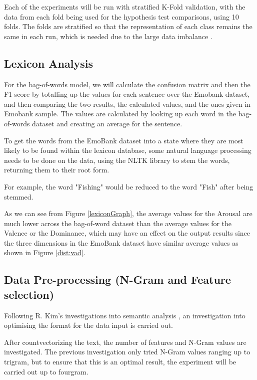 Each of the experiments will be run with stratified K-Fold validation, with the data from each fold being used for the hypothesis test comparisons, using 10 folds. The folds are stratified so that the representation of each class remains the same in each run, which is needed due to the large data imbalance \cite{kohavi1995study}.

\subsection{Lexicon Analysis}

For the bag-of-words model, we will calculate the confusion matrix and then the F1 score by totalling up the values for each sentence over the Emobank dataset, and then comparing the two results, the calculated values, and the ones given in Emobank sample. The values are calculated by looking up each word in the bag-of-words dataset and creating an average for the sentence.

To get the words from the EmoBank dataset into a state where they are most likely to be found within the lexicon database, some natural language processing needs to be done on the data, using the NLTK \cite{NLTKBook} library to stem the words, returning them to their root form.

For example, the word "Fishing" would be reduced to the word "Fish" after being stemmed. 

As we can see from Figure \ref{lexiconGraph}, the average values for the Arousal are much lower across the bag-of-word dataset than the average values for the Valence or the Dominance, which may have an effect on the output results since the three dimensions in the EmoBank dataset have similar average values as shown in Figure \ref{dist:vad}.


\subsection{Data Pre-processing (N-Gram and Feature selection)}

Following R. Kim's investigations into semantic analysis \cite{towardsDS}, an investigation into optimising the format for the data input is carried out. 

After countvectorizing the text, the number of features and N-Gram values are investigated. The previous investigation only tried N-Gram values ranging up to trigram, but to ensure that this is an optimal result, the experiment will be carried out up to fourgram.

